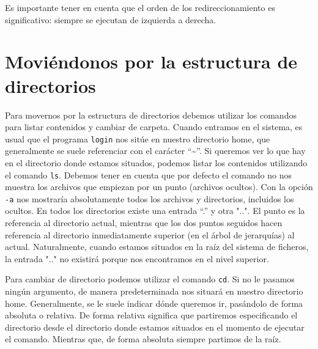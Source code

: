 \documentclass[12pt]{article}
\begin{document}
Es importante tener en cuenta que el orden de los redireccionamiento es 
significativo: siempre se ejecutan de izquierda a derecha.

\section{Moviéndonos por la estructura de directorios}

Para movernos por la estructura de directorios debemos utilizar los comandos para 
listar contenidos y cambiar de carpeta. Cuando entramos en el sistema, es usual 
que el programa \texttt{login} nos sitúe en nuestro directorio home, que generalmente se suele 
referenciar con el carácter ``\textasciitilde''. Si queremos ver lo que hay en el 
directorio donde estamos situados, podemos listar los contenidos utilizando el 
comando \texttt{ls}. Debemos tener en cuenta que por defecto el comando no nos muestra los 
archivos que empiezan por un punto (archivos ocultos). Con la opción \texttt{-a} nos mostraría 
absolutamente todos los archivos y directorios, incluidos los ocultos. En todos los directorios existe una entrada 
``.'' y otra "..". El punto es la referencia al directorio actual, mientras 
que los dos puntos seguidos hacen referencia al directorio inmediatamente superior 
(en el árbol de jerarquías) al actual. Naturalmente, cuando estamos situados en 
la raíz del sistema de ficheros, la entrada ".." no existirá porque nos encontramos 
en el nivel superior.

Para cambiar de directorio podemos utilizar el comando \texttt{cd}. Si no le pasamos ningún argumento, 
de manera predeterminada nos situará en nuestro directorio home. Generalmente, se le suele indicar 
dónde queremos ir, pasándolo de forma absoluta o relativa. De forma relativa significa que partiremos 
especificando el directorio desde el directorio donde estamos situados en el momento de ejecutar el comando. 
Mientras que, de forma absoluta siempre partimos de la raíz.

\end{document}
